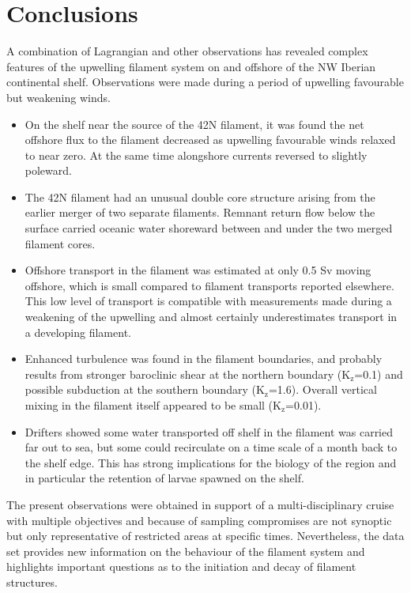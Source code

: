 \section{Conclusions}%
A combination of Lagrangian and other observations has revealed
complex features of the upwelling filament system on and offshore
of the NW Iberian continental shelf.  Observations were made
during a period of upwelling favourable but weakening  winds.
\begin{itemize}
\item On the shelf near the source of the 42\deg N filament, it was found
the net offshore flux to the filament decreased as upwelling
favourable winds relaxed to near zero.  At the same time
alongshore currents reversed to slightly poleward.
\item The 42\deg N filament had an unusual double core structure arising
from the earlier merger of two separate filaments. Remnant return
flow below the surface carried oceanic water shoreward between and
under the two merged filament cores.
\item Offshore transport in the filament was estimated at only 0.5 Sv
moving offshore,  which is small compared to filament transports
reported elsewhere.  This low level of transport is compatible
with measurements made during a weakening of the upwelling and
almost certainly underestimates transport in a developing
filament.
\item Enhanced turbulence was found in the filament boundaries, and
probably results  from stronger baroclinic shear at the northern
boundary ($\mathrm{K_z}$=0.1\mixc ) and possible subduction at the
southern boundary ($\mathrm{K_z}$=1.6\mixc ). Overall vertical
mixing in the filament itself appeared to be small
($\mathrm{K_z}$=0.01\mixc ).
\item Drifters showed some water transported off shelf in the filament
was carried far out to sea, but some could recirculate on a time
scale of a month back to the shelf edge. This has strong
implications for the biology of the region and in particular the
retention of larvae spawned on the shelf.
\end{itemize}
The present observations were obtained in support of a
multi-disciplinary cruise with multiple objectives and because of
sampling compromises are not synoptic but only representative of
restricted areas at specific times. Nevertheless, the data set
provides new information on the behaviour of the filament system
and highlights important questions as to the initiation and decay
of filament structures.
